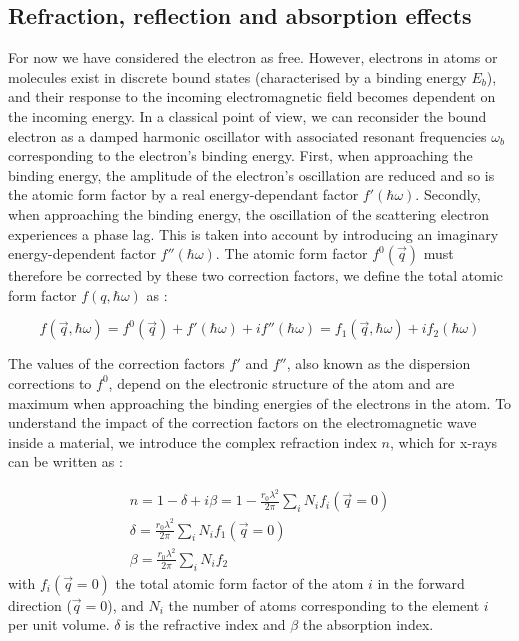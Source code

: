 \subsection{Refraction, reflection and absorption effects}\label{sec:RefractionReflectionAbsorption}

For now we have considered the electron as free.
However, electrons in atoms or molecules exist in discrete bound states (characterised by a binding energy $E_b$), and their response to the incoming electromagnetic field becomes dependent on the incoming energy.
In a classical point of view, we can reconsider the bound electron as a damped harmonic oscillator with associated resonant frequencies $\omega_b$ corresponding to the electron's binding energy.
First, when approaching the binding energy, the amplitude of the electron's oscillation are reduced and so is the atomic form factor by a real energy-dependant factor $f'(\hbar\omega)$.
Secondly, when approaching the binding energy, the oscillation of the scattering electron experiences a phase lag.
This is taken into account by introducing an imaginary energy-dependent factor $f''(\hbar\omega)$.
The atomic form factor $f^0(\vec{q})$ must therefore be corrected by these two correction factors, we define the total atomic form factor $f(q, \hbar\omega)$ as \parencite{NielsenMcMorrow}:

\begin{equation}
    f(\vec{q}, \hbar\omega) = f^0(\vec{q}) + f'(\hbar\omega) + if''(\hbar\omega) = f_1(\vec{q}, \hbar\omega) + i f_2(\hbar\omega)
\end{equation}

The values of the correction factors $f'$ and $f''$, also known as the dispersion corrections to $f^0$, depend on the electronic structure of the atom and are maximum when approaching the binding energies of the electrons in the atom.
To understand the impact of the correction factors on the electromagnetic wave inside a material, we introduce the complex refraction index $n$, which for x-rays can be written as \parencite{NielsenMcMorrow}:

\begin{gather}
    n = 1-\delta+i\beta = 1 - \frac{r_0 \lambda^2}{2\pi} \sum_i N_i f_i(\vec{q}=0)\\
    \label{eq:delta}
    \delta = \frac{r_0 \lambda^2}{2\pi} \sum_i N_i f_1(\vec{q}=0)\\
    \beta = \frac{r_0 \lambda^2}{2\pi} \sum_i N_i f_2
\end{gather}
with $f_i(\vec{q}=0)$ the total atomic form factor of the atom $i$ in the forward direction ($\vec{q}=0$), and $N_i$ the number of atoms corresponding to the element $i$ per unit volume.
$\delta$ is the refractive index and $\beta$ the absorption index.

